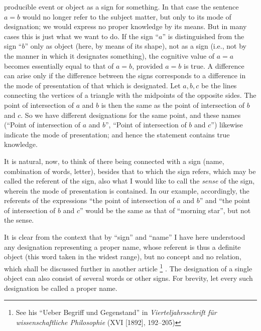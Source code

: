 \documentclass[twoside,12pt]{article}
\newcommand{\footnoteAlph}[2][\thefootnote]{%
  \renewcommand{\thefootnote}{\Alph{footnote}}%
  \footnote[#1]{#2}%
  \renewcommand{\thefootnote}{\arabic{footnote}}}
\begin{document}
producible event or object as a sign for something. In that case the
sentence $a=b$ would no longer refer to the subject matter, but only
to its mode of designation; we would express no proper knowledge by
its means. But in many cases this is just what we want to do. If the
sign ``$a$'' is distinguished from the sign ``$b$'' only as object
(here, by means of its shape), not as a sign (i.e., not by the manner
in which it designates something), the cognitive value of $a=a$
becomes essentially equal to that of $a=b$, provided $a=b$ is true. A
difference can arise only if the difference between the signs
corresponds to a difference in the mode of presentation of that which
is designated. Let $a, b, c$ be the lines connecting the vertices of a
triangle with the midpoints of the opposite sides. The point of
intersection of $a$ and $b$ is then the same as the point of
intersection of $b$ and $c$. So we have different designations for the
same point, and these names (``Point of intersection of $a$ and $b$'',
``Point of intersection of $b$ and $c$'') likewise indicate the mode
of presentation; and hence the statement contains true knowledge.

It is natural, now, to think of there being connected with a sign
(name, combination of words, letter), besides that to which the sign
refers, which may be called the referent of the sign, also what I
would like to call the \emph{sense} of the sign, wherein the mode of
presentation is contained. In our example, accordingly, the referents
of the expressions  ``the point of intersection of $a$
and $b$'' and ``the point of intersection of $b$ and $c$'' would be
the same as that of ``morning star'', but not the sense.

It is clear from the context that by ``sign'' and ``name'' I have here
understood any designation representing a proper name, whose referent
is thus a definite object (this word taken in the widest range), but
no concept and no relation, which shall be discussed further in
another article\footnoteAlph[2]{See his ``Ueber Begriff und
  Gegenstand'' in {\it Vierteljahrsschrift f\"ur wissenschaftliche
    Philosophie} (XVI [1892], 192--205)}. The designation of a single
object can also consist of several words or other signs. For brevity,
let every such designation be called a proper name.
\end{document}

